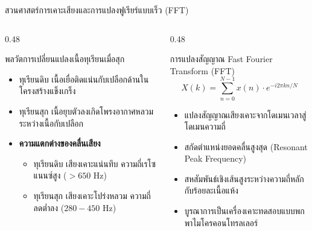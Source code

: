 \documentclass[aspectratio=169, 10pt]{beamer}
\begin{document}
\begin{frame}{สวนศาสตร์การเคาะเสียงและการแปลงฟูเรียร์แบบเร็ว (FFT)}
\begin{columns}[T]
    \begin{column}{0.48\textwidth}
        \begin{mastercard}{พลวัตการเปลี่ยนแปลงเนื้อทุเรียนเมื่อสุก}
            \begin{itemize}
                \item ทุเรียนดิบ เนื้อเยื่อติดแน่นกับเปลือกด้านใน โครงสร้างแข็งเกร็ง
                \item ทุเรียนสุก เนื้อยุบตัวลงเกิดโพรงอากาศหลวมระหว่างเนื้อกับเปลือก
                \item \textbf{ความแตกต่างของคลื่นเสียง}
                \begin{itemize}
                    \item ทุเรียนดิบ เสียงเคาะแน่นทึบ ความถี่เรโซแนนซ์สูง ($> 650\text{ Hz}$)
                    \item ทุเรียนสุก เสียงเคาะโปร่งหลวม ความถี่ลดต่ำลง ($280 - 450\text{ Hz}$)
                \end{itemize}
            \end{itemize}
        \end{mastercard}
    \end{column}
    \begin{column}{0.48\textwidth}
        \begin{goldcard}{การแปลงสัญญาณ Fast Fourier Transform (FFT)}
            \begin{equation*}
                X(k) = \sum_{n=0}^{N-1} x(n) \cdot e^{-i 2\pi k n / N}
            \end{equation*}
            \begin{itemize}
                \item แปลงสัญญาณเสียงเคาะจากโดเมนเวลาสู่โดเมนความถี่
                \item สกัดตำแหน่งยอดคลื่นสูงสุด (Resonant Peak Frequency)
                \item สหสัมพันธ์เชิงเส้นสูงระหว่างความถี่หลักกับร้อยละเนื้อแห้ง
                \item บูรณาการเป็นเครื่องเคาะทดสอบแบบพกพาไมโครคอนโทรลเลอร์
            \end{itemize}
        \end{goldcard}
    \end{column}
\end{columns}
\end{frame}
\end{document}

